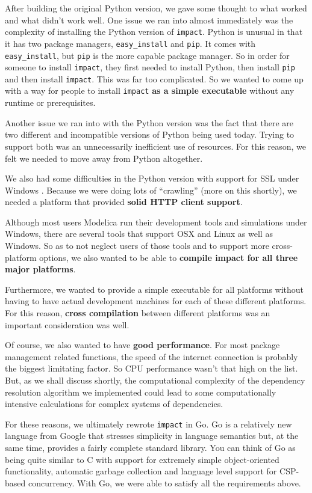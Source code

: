 \documentclass[11pt,a4paper,twocolumn]{article}
\newcommand{\code}[1]{\texttt{#1}} %
\begin{document}
After building the original Python version, we gave some thought to
what worked and what didn't work well.  One issue we ran into almost
immediately was the complexity of installing the Python version of
\code{impact}.  Python is unusual in that it has two package managers,
\code{easy\_install} and \code{pip}.  It comes with
\code{easy\_install}, but \code{pip} is the more capable package
manager.  So in order for someone to install \code{impact}, they first
needed to install Python, then install \code{pip} and then install
\code{impact}.  This was far too complicated.  So we wanted to come up
with a way for people to install \code{impact} {\bf as a simple
  executable} without any runtime or prerequisites.

Another issue we ran into with the Python version was the fact that
there are two different and incompatible versions of Python being used
today.  Trying to support both was an unnecessarily inefficient use of
resources.  For this reason, we felt we needed to move away from
Python altogether.

We also had some difficulties in the Python version with support for
SSL under Windows \cite{python-ssl}.  Because we were doing lots of
``crawling'' (more on this shortly), we needed a platform that
provided {\bf solid HTTP client support}.

Although most users Modelica run their development tools and
simulations under Windows, there are several tools that support OSX
and Linux as well as Windows.  So as to not neglect users of those
tools and to support more cross-platform options, we also wanted to be
able to {\bf compile impact for all three major platforms}.

Furthermore, we wanted to provide a simple executable for all
platforms without having to have actual development machines for each
of these different platforms.  For this reason, {\bf cross
  compilation} between different platforms was an important
consideration was well.

Of course, we also wanted to have {\bf good performance}.  For most
package management related functions, the speed of the internet
connection is probably the biggest limitating factor.  So CPU
performance wasn't that high on the list.  But, as we shall discuss
shortly, the computational complexity of the dependency resolution
algorithm we implemented could lead to some computationally intensive
calculations for complex systems of dependencies.

For these reasons, we ultimately rewrote \code{impact} in Go.  Go is a
relatively new language from Google that stresses simplicity in
language semantics but, at the same time, provides a fairly complete
standard library.  You can think of Go as being quite similar to C
with support for extremely simple object-oriented functionality,
automatic garbage collection and language level support for CSP-based
concurrency.  With Go, we were able to satisfy all the requirements
above.
\end{document}
